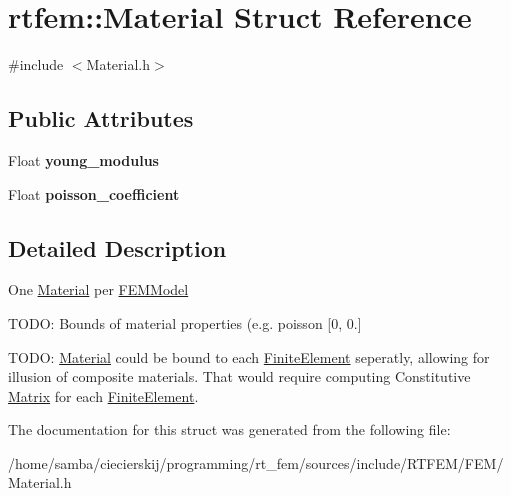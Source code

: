 \hypertarget{structrtfem_1_1Material}{}\section{rtfem\+:\+:Material Struct Reference}
\label{structrtfem_1_1Material}


{\ttfamily \#include $<$Material.\+h$>$}

\subsection*{Public Attributes}
\begin{DoxyCompactItemize}
\item 
\mbox{\label{structrtfem_1_1Material_a5743ec415411f1d7861938245e33ba7f}} 
Float {\bfseries young\+\_\+modulus}
\item 
\mbox{\label{structrtfem_1_1Material_a6e6d121609178a7ed876fc8be303bad9}} 
Float {\bfseries poisson\+\_\+coefficient}
\end{DoxyCompactItemize}


\subsection{Detailed Description}
One \hyperlink{structrtfem_1_1Material}{Material} per \hyperlink{classrtfem_1_1FEMModel}{F\+E\+M\+Model}

T\+O\+DO\+: Bounds of material properties (e.\+g. poisson \mbox{[}0, 0.\mbox{]}

T\+O\+DO\+: \hyperlink{structrtfem_1_1Material}{Material} could be bound to each \hyperlink{classrtfem_1_1FiniteElement}{Finite\+Element} seperatly, allowing for \textquotesingle{}illusion\textquotesingle{} of composite materials. That would require computing Constitutive \hyperlink{classrtfem_1_1Matrix}{Matrix} for each \hyperlink{classrtfem_1_1FiniteElement}{Finite\+Element}. 

The documentation for this struct was generated from the following file\+:\begin{DoxyCompactItemize}
\item 
/home/samba/ciecierskij/programming/rt\+\_\+fem/sources/include/\+R\+T\+F\+E\+M/\+F\+E\+M/Material.\+h\end{DoxyCompactItemize}
